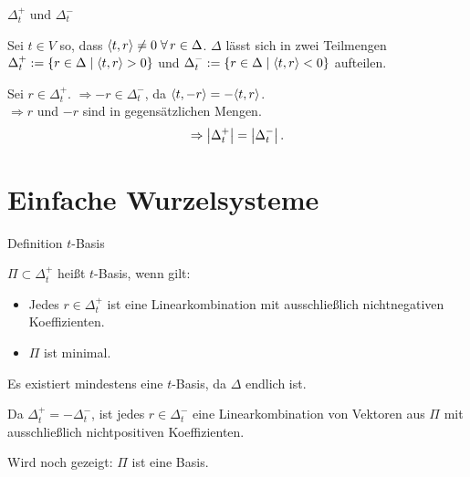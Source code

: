 \documentclass{beamer}
\begin{document}
\begin{frame}{\( \Delta_t^+ \) und \( \Delta_t^- \)}
    \begin{defi}
        Sei \( t \in V \) so, dass \( \scalarprod{t}{r} \neq 0 
        \; \forall r \in \Delta \). \pause
        \( \Delta \) lässt sich in zwei Teilmengen 
        \( \Delta_t^+ := 
        \{r \in \Delta \;\vert \; \langle t, r \rangle > 0\} \) 
        und \( \Delta_t^- := 
        \{r \in \Delta \;\vert \; \langle t, r \rangle < 0\} \) 
        aufteilen. \pause
    \end{defi}
    

    Sei \( r \in \Delta_t^+ \). \( \Rightarrow -r \in \Delta_t^- \), 
    da \( \langle t, -r \rangle = -\langle t, r \rangle \).\\
    \( \Rightarrow r \) und \( -r \) sind in 
    gegensätzlichen Mengen. \pause
    \[ \Rightarrow \left|\Delta_t^+\right| = \left|\Delta_t^-\right|. \]
\end{frame}

\section{Einfache Wurzelsysteme}
\begin{frame}{Definition \( t \)-Basis}
    \begin{defi}
        \( \Pi \subset \Delta_t^+ \) heißt \( t \)-Basis, 
        wenn gilt:
        \begin{itemize}
            \item Jedes \( r \in \Delta_t^+ \) ist 
            eine Linearkombination mit ausschließlich 
            nichtnegativen Koeffizienten.
            \item \( \Pi \) ist minimal.
        \end{itemize} \pause
        Es existiert mindestens eine \( t \)-Basis, 
        da \( \Delta \) endlich ist. \pause
    \end{defi}
    
    
    Da \( \Delta_t^+ = - \Delta_t^- \), ist jedes 
    \( r \in \Delta_t^- \) eine Linearkombination 
    von Vektoren aus \( \Pi \) 
    mit ausschließlich nichtpositiven Koeffizienten.

    \pause
    Wird noch gezeigt: \( \Pi \) ist eine Basis.
\end{frame}
\end{document}
